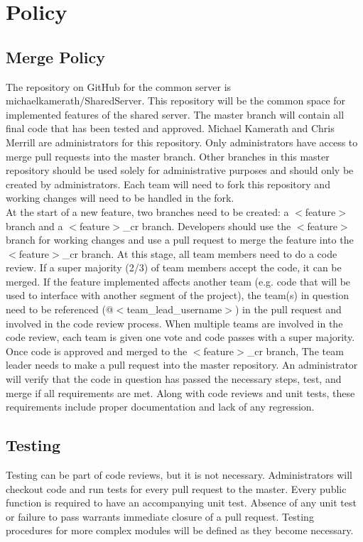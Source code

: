 \section*
{
  Policy
}
\subsection*
{
  Merge Policy
}
The repository on GitHub for the common server is michaelkamerath/SharedServer. This repository will be the common space for implemented features of the shared server. The master branch will contain all final code that has been tested and approved. Michael Kamerath and Chris Merrill are administrators for this repository. Only administrators have access to merge pull requests into the master branch. Other branches in this master repository should be used solely for administrative purposes and should only be created by administrators. Each team will need to fork this repository and working changes will need to be handled in the fork.\\
At the start of a new feature, two branches need to be created: a $<$feature$>$ branch and a $<$feature$>$\_cr branch. Developers should use the $<$feature$>$ branch for working changes and use a pull request to merge the feature into the $<$feature$>$\_cr branch. At this stage, all team members need to do a code review. If a super majority (2/3) of team members accept the code, it can be merged. If the feature implemented affects another team (e.g. code that will be used to interface with another segment of the project), the team(s) in question need to be referenced (@$<$team\_lead\_username$>$) in the pull request and involved in the code review process. When multiple teams are involved in the code review, each team is given one vote and code passes with a super majority.\\
Once code is approved and merged to the $<$feature$>$\_cr branch, The team leader needs to make a pull request into the master repository. An administrator will verify that the code in question has passed the necessary steps, test, and merge if all requirements are met. Along with code reviews and unit tests, these requirements include proper documentation and lack of any regression.\\
\subsection*
{
  Testing
}
Testing can be part of code reviews, but it is not necessary. Administrators will checkout code and run tests for every pull request to the master. Every public function is required to have an accompanying unit test. Absence of any unit test or failure to pass warrants immediate closure of a pull request. Testing procedures for more complex modules will be defined as they become necessary.\pagebreak
